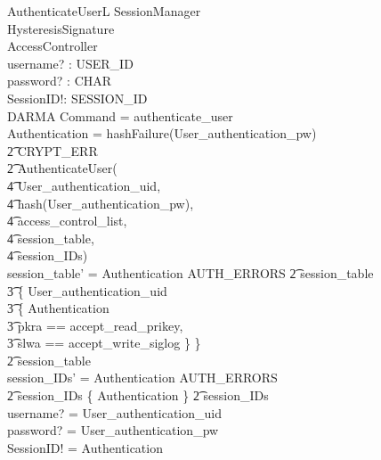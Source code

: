 \documentclass[a4paper,pdftex]{article}
\begin{document}
\begin{schema}{AuthenticateUserL}
  \Delta SessionManager   \\
  \Xi HysteresisSignature \\
  \Xi AccessController    \\
  username? : USER\_ID    \\
  password? : \seq CHAR   \\
  SessionID!: SESSION\_ID \\
  DARMA
  \where
  Command = authenticate\_user \\
  Authentication =  \IF  hashFailure(User\_authentication\_pw) \\
\t2  \THEN  CRYPT\_ERR \\
\t2  \ELSE  AuthenticateUser( \\
\t4   User\_authentication\_uid, \\
\t4   hash(User\_authentication\_pw), \\
\t4   access\_control\_list, \\
\t4   session\_table, \\
\t4   session\_IDs) \\
  session\_table' = \IF Authentication  \notin AUTH\_ERRORS 
\t2 \THEN session\_table \cup \\
\t3   \{ User\_authentication\_uid \mapsto \\
\t3   \{ Authentication \mapsto \\
\t3    \lbind pkra == accept\_read\_prikey, \\
\t3    slwa == accept\_write\_siglog \rbind \} \} \\
\t2 \ELSE session\_table \\
  session\_IDs' = \IF Authentication  \notin AUTH\_ERRORS \\
\t2 \THEN session\_IDs \cup \{ Authentication \} 
\t2 \ELSE session\_IDs \\
username? = User\_authentication\_uid \\
password? = User\_authentication\_pw \\
SessionID! = Authentication
\end{schema}
\end{document}
